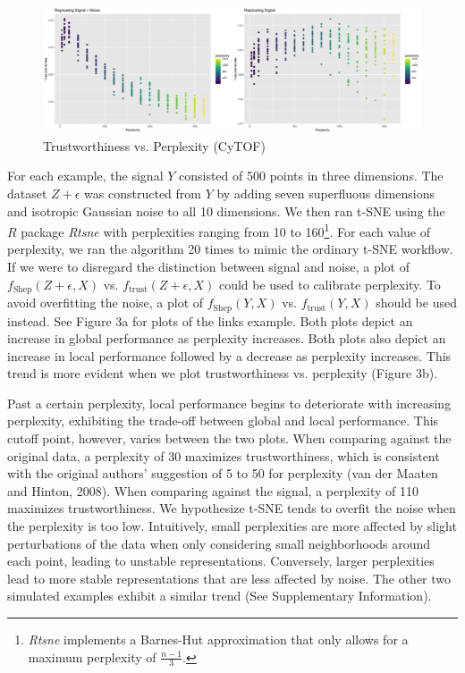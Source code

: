 \documentclass[webpdf,modern,large,namedate]{oup-authoring-template}
\theoremstyle{thmstyleone}%
\theoremstyle{thmstyletwo}%
\theoremstyle{thmstylethree}%
\begin{document}
\renewcommand{\thefigure}{4b}
\begin{figure}[t]
\includegraphics[scale=0.28]{trust plot (CyTOF)}
\centering
\caption{Trustworthiness vs. Perplexity (CyTOF)}
\end{figure}

For each example, the signal $Y$ consisted of 500 points in three dimensions. The dataset $Z + \epsilon$ was constructed from $Y$ by adding seven superfluous dimensions and isotropic Gaussian noise to all 10 dimensions. We then ran t-SNE using the $R$ package \textit{Rtsne} with perplexities ranging from 10 to 160\footnote{\textit{Rtsne} implements a Barnes-Hut approximation that only allows for a maximum perplexity of $\frac{n-1}{3}$.}. For each value of perplexity, we ran the algorithm 20 times to mimic the ordinary t-SNE workflow. If we were to disregard the distinction between signal and noise, a plot of $f_\textrm{Shep}(Z + \epsilon, X)$ vs. $f_\textrm{trust}(Z + \epsilon, X)$ could be used to calibrate perplexity. To avoid overfitting the noise, a plot of $f_\textrm{Shep}(Y, X)$ vs. $f_\textrm{trust}(Y, X)$ should be used instead. See Figure 3a for plots of the links example. Both plots depict an increase in global performance as perplexity increases. Both plots also depict an increase in local performance followed by a decrease as perplexity increases. This trend is more evident when we plot trustworthiness vs. perplexity (Figure 3b).

Past a certain perplexity, local performance begins to deteriorate with increasing perplexity, exhibiting the trade-off between global and local performance. This cutoff point, however, varies between the two plots. When comparing against the original data, a perplexity of 30 maximizes trustworthiness, which is consistent with the original authors' suggestion of 5 to 50 for perplexity (van der Maaten and Hinton, 2008). When comparing against the signal, a perplexity of 110 maximizes trustworthiness. We hypothesize t-SNE tends to overfit the noise when the perplexity is too low. Intuitively, small perplexities are more affected by slight perturbations of the data when only considering small neighborhoods around each point, leading to unstable representations. Conversely, larger perplexities lead to more stable representations that are less affected by noise. The other two simulated examples exhibit a similar trend (See Supplementary Information).
\end{document}
